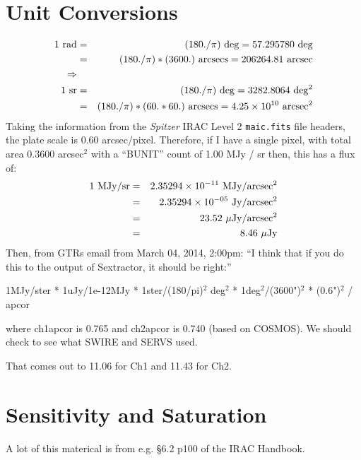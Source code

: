 \documentclass[11pt,a4paper]{article}
\begin{document}
\section{Unit Conversions} 
\begin{eqnarray}
  1\ {\rm rad}  & = & (180./\pi)\ {\rm deg} = 57.295780\ {\rm deg} \\ 
                     & = & (180./\pi)*(3600.)\ {\rm arcsecs} = 206264.81\ {\rm arcsec} \\
\Rightarrow & & \\
  1\ {\rm sr}  & = & (180./\pi)\ {\rm deg} = 3282.8064\ {\rm deg^2} \\ 
                   & = & (180./\pi) *(60.*60.)\ {\rm arcsecs} =  4.25\times10^{10}\ {\rm arcsec^2}
\end{eqnarray}
Taking the information from the {\it Spitzer} IRAC Level 2 {\tt *maic.fits} file headers,  
the plate scale is 0.60 arcsec/pixel. 
Therefore, if I have a single pixel, with total area 0.3600 arcsec$^{2}$ 
with a ``BUNIT'' count of 1.00 MJy / sr then, this has a flux of:
\begin{eqnarray}
  1 \ {\rm MJy / sr} & = & 2.35294\times10^{-11}\ {\rm MJy /arcsec^2}  \\
                           & = & 2.35294\times10^{-05}\ {\rm Jy /arcsec^2}  \\
                           & = & 23.52\ {\rm \mu Jy /arcsec^2}  \\
                           & = & 8.46\ {\rm \mu Jy}  \\
\end{eqnarray}
Then, from GTRs email from March 04, 2014, 2:00pm:
``I think that if you do this to the output of Sextractor, it should be right:''

\smallskip
\noindent
1MJy/ster * 1uJy/1e-12MJy * 1ster/(180/pi)$^2$ deg$^2$ * 1deg$^2$/(3600")$^2$ * (0.6")$^2$ / apcor

where ch1apcor is 0.765 and ch2apcor is 0.740
(based on COSMOS).  We should check to see what SWIRE and SERVS used.

That comes out to 11.06 for Ch1 and 11.43 for Ch2. 

\section{Sensitivity and Saturation}
A lot of this materical is from e.g. \S6.2 p100 of the IRAC Handbook.
\end{document}
